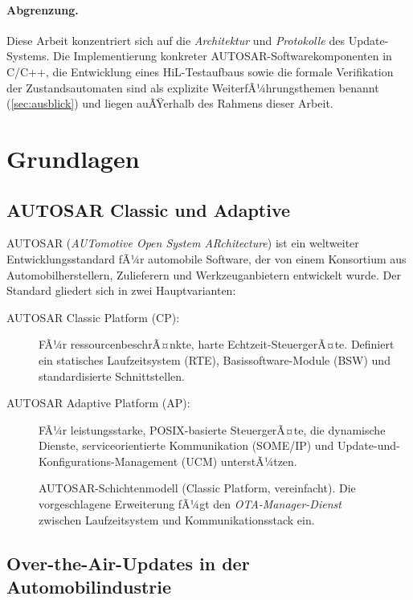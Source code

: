 ﻿\documentclass[12pt,a4paper,twoside]{article}
\begin{document}
\paragraph{Abgrenzung.}
Diese Arbeit konzentriert sich auf die \emph{Architektur} und
\emph{Protokolle} des Update-Systems. Die Implementierung
konkreter AUTOSAR-Softwarekomponenten in C/C++, die Entwicklung
eines HiL-Testaufbaus sowie die formale Verifikation der
Zustandsautomaten sind als explizite WeiterfÃ¼hrungsthemen benannt
(\cref{sec:ausblick}) und liegen auÃŸerhalb des Rahmens
dieser Arbeit.

\section{Grundlagen}
\label{sec:grundlagen}

\subsection{AUTOSAR Classic und Adaptive}
\label{subsec:autosar}

AUTOSAR (\textit{AUTomotive Open System ARchitecture}) ist ein weltweiter
Entwicklungsstandard fÃ¼r automobile Software, der von einem Konsortium aus
Automobilherstellern, Zulieferern und Werkzeuganbietern entwickelt wurde.
Der Standard gliedert sich in zwei Hauptvarianten:

\begin{description}
  \item[AUTOSAR Classic Platform (CP):] FÃ¼r ressourcenbeschrÃ¤nkte,
    harte Echtzeit-Steuer\-gerÃ¤te. Definiert ein statisches Laufzeitsystem
    (RTE), Basissoftware-Module (BSW) und standardisierte Schnittstellen.
  \item[AUTOSAR Adaptive Platform (AP):] FÃ¼r leistungsstarke,
    POSIX-basierte SteuergerÃ¤te, die dynamische Dienste, serviceorientierte
    Kommunikation (SOME/IP) und Update-und-Konfigurations-Management (UCM)
    unterstÃ¼tzen.
\end{description}

\begin{figure}[h!]
  \centering
  
  \caption{AUTOSAR-Schichtenmodell (Classic Platform, vereinfacht).
    Die vorgeschlagene Erweiterung fÃ¼gt den \emph{OTA-Manager-Dienst}
    zwischen Laufzeitsystem und Kommunikationsstack ein.}
  \label{fig:autosar_layers}
\end{figure}

\subsection{Over-the-Air-Updates in der Automobilindustrie}
\end{document}

